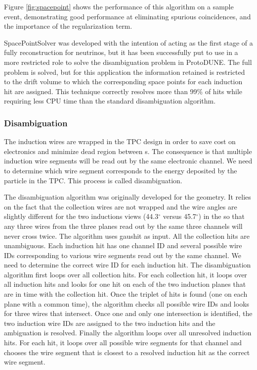 Figure \ref{fig:spacepoint} shows the performance of this algorithm on a sample   event, demonstrating good performance at eliminating spurious coincidences, and the importance of the regularization term.

SpacePointSolver was developed with the intention of acting as the first stage of a fully \threed reconstruction for  neutrinos, but it has been successfully put to use in a more restricted role to solve the disambiguation problem in ProtoDUNE. The full problem is solved, but for this application the information retained is restricted to the drift volume to which the corresponding space points for each induction hit are assigned. This technique correctly resolves more than 99\% of hits while requiring less CPU time than the standard disambiguation algorithm.

\subsubsection{Disambiguation}
The induction wires are wrapped in the  TPC design in order to save cost on electronics and minimize dead region between s. The consequence is that multiple induction wire segments will be read out by the same electronic channel. We need to determine which wire segment corresponds to the energy deposited by the particle in the TPC. This process is called disambiguation. 

The  disambiguation algorithm was originally developed for the  geometry. It relies on the fact that the collection wires are not wrapped and the wire angles are slightly different for the two inductions views (44.3$^{\circ}$ versus 45.7$^{\circ}$) in the  so that any three wires from the three planes read out by the same three channels will never cross twice. The algorithm uses gaushit as input. All the collection hits are unambiguous. Each induction hit has one channel ID and several possible wire IDs corresponding to various wire segments read out by the same channel. We need to determine the correct wire ID %
for each induction hit. The disambiguation algorithm first loops over all collection hits. For each collection hit, it loops over all induction hits and looks for one hit on each of the two induction planes that are in time with the collection hit. Once the triplet of hits is found (one on each plane with a common time), the algorithm checks all possible wire IDs and looks for three wires that intersect. Once one and only one intersection is identified, the two induction wire IDs are assigned to the two induction hits and the ambiguation is resolved. Finally the algorithm loops over all unresolved induction hits. For each hit, it loops over all possible wire segments for that channel and chooses the wire segment that is closest to a resolved induction hit as the correct wire segment. 

